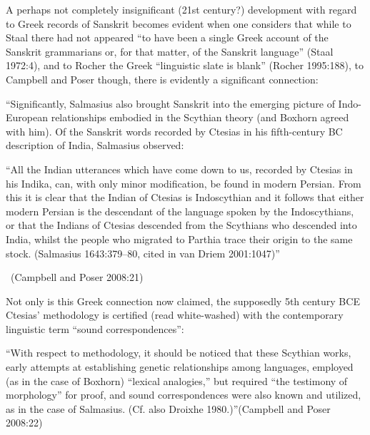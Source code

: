 A perhaps not completely insignificant (21st century?) development with regard to Greek records of Sanskrit becomes evident when one considers that while to Staal there had not appeared “to have been a single Greek account of the Sanskrit grammarians or, for that matter, of the Sanskrit language” (Staal 1972:4), and to Rocher the Greek “linguistic slate is blank” (Rocher 1995:188), to Campbell and Poser though, there is evidently a significant connection:

\begin{myquote}
“Significantly, Salmasius also brought Sanskrit into the emerging picture of Indo-European relationships embodied in the Scythian theory (and Boxhorn agreed with him). Of the Sanskrit words recorded by Ctesias in his fifth-century BC description of India, Salmasius observed:
\end{myquote}

\begin{myquote}
“All the Indian utterances which have come down to us, recorded by Ctesias in his Indika, can, with only minor modification, be found in modern Persian. From this it is clear that the Indian of Ctesias is Indoscythian and it follows that either modern Persian is the descendant of the language spoken by the Indoscythians, or that the Indians of Ctesias descended from the Scythians who descended into India, whilst the people who migrated to Parthia trace their origin to the same stock. (Salmasius 1643:379–80, cited in van Driem 2001:1047)”

~\hfill (Campbell and Poser 2008:21)
\end{myquote}

Not only is this Greek connection now claimed, the supposedly 5th century BCE Ctesias’ methodology is certified (read white-washed) with the contemporary linguistic term “sound correspondences”:

\begin{myquote}
“With respect to methodology, it should be noticed that these Scythian works, early attempts at establishing genetic relationships among languages, employed (as in the case of Boxhorn) “lexical analogies,” but required “the testimony of morphology” for proof, and sound correspondences were also known and utilized, as in the case of Salmasius. (Cf. also Droixhe 1980.)”\hfill (Campbell and Poser 2008:22)
\end{myquote}

